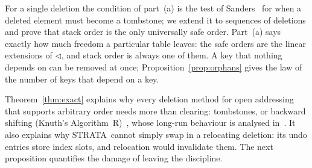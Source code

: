 \documentclass[11pt,a4paper]{article}
\theoremstyle{definition}
\theoremstyle{remark}
\newcommand{\st}{STRATA}
\begin{document}
For a single deletion the condition of part~(a) is the test of Sanders~\cite[Sect.~2]{sanders2018} for when a deleted element must become a tombstone; we extend it to sequences of deletions and prove that stack order is the only universally safe order. Part~(a) says exactly how much freedom a particular table leaves: the safe orders are the linear extensions of $\lhd$, and stack order is always one of them. A key that nothing depends on can be removed at once; Proposition~\ref{prop:orphans} gives the law of the number of keys that depend on a key.

Theorem~\ref{thm:exact} explains why every deletion method for open addressing that supports arbitrary order needs more than clearing: tombstones, or backward shifting (Knuth's Algorithm~R)~\cite{knuth3,jimenez2018}, whose long-run behaviour is analysed in~\cite{bender2021}. It also explains why \st\ cannot simply swap in a relocating deletion: its undo entries store index slots, and relocation would invalidate them. The next proposition quantifies the damage of leaving the discipline.
\end{document}
